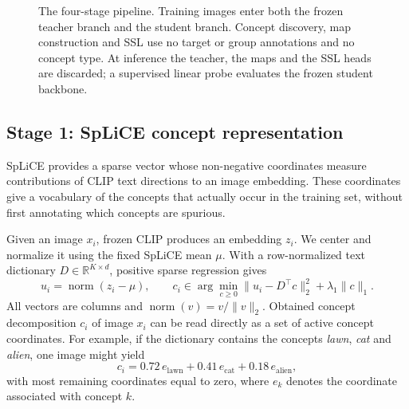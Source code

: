 \documentclass{article}
\begin{document}
\begin{figure}[htbp]
\centering
{}
\caption{The four-stage pipeline. Training images enter both the frozen teacher branch and the student branch. Concept discovery, map construction and SSL use no target or group annotations and no concept type. At inference the teacher, the maps and the SSL heads are discarded; a supervised linear probe evaluates the frozen student backbone.}
\label{fig:architecture}
\end{figure}

\subsection{Stage 1: SpLiCE concept representation}
SpLiCE provides a sparse vector whose non-negative coordinates measure contributions of CLIP text directions to an image embedding. These coordinates give a vocabulary of the concepts that actually occur in the training set, without first annotating which concepts are spurious.

Given an image $x_i$, frozen CLIP produces an embedding $z_i$. We center and normalize it using the fixed SpLiCE mean $\mu$. With a row-normalized text dictionary $D\in\mathbb{R}^{K\times d}$, positive sparse regression gives
\begin{equation}
 u_i=\operatorname{norm}(z_i-\mu),\qquad
 c_i\in\arg\min_{c\geq0}\|u_i-D^\top c\|_2^2+\lambda_1\|c\|_1.
\end{equation}
All vectors are columns and \(\operatorname{norm}(v)=v/\lVert v\rVert_2\). Obtained concept decomposition $c_i$ of image $x_i$ can be read directly as a set of active concept coordinates. For example, if the dictionary contains the concepts \emph{lawn}, \emph{cat} and \emph{alien}, one image might yield
\[
c_i =
0.72\,e_{\text{lawn}}
+ 0.41\,e_{\text{cat}}
+ 0.18\,e_{\text{alien}},
\]
with most remaining coordinates equal to zero, where $e_k$ denotes the
coordinate associated with concept $k$.
\end{document}
